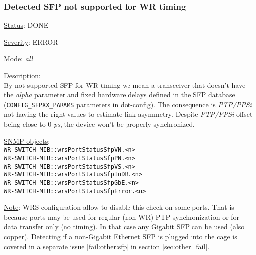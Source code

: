 \subsubsection{\bf Detected SFP not supported for WR timing}
		\label{fail:timing:wrong_sfp}
		\begin{packed_enum}
			\item [] \underline{Status}: DONE
			\item [] \underline{Severity}: ERROR
			\item [] \underline{Mode}: \emph{all}
			\item [] \underline{Description}:\\
				By not supported SFP for WR timing we mean a transceiver that doesn't
				have the \emph{alpha} parameter and fixed hardware delays defined in the
				SFP database (\texttt{CONFIG\_SFPXX\_PARAMS} parameters in dot-config). The consequence is
				\emph{PTP/PPSi} not having the right values to estimate link asymmetry.
				Despite \emph{PTP/PPSi} offset being close to 0 \emph{ps}, the device won't
				be properly synchronized.
			\item [] \underline{SNMP objects}:\\
				\texttt{WR-SWITCH-MIB::wrsPortStatusSfpVN.<n>}\\
				\texttt{WR-SWITCH-MIB::wrsPortStatusSfpPN.<n>}\\
				\texttt{WR-SWITCH-MIB::wrsPortStatusSfpVS.<n>}\\
				\texttt{WR-SWITCH-MIB::wrsPortStatusSfpInDB.<n>}\\
				\texttt{WR-SWITCH-MIB::wrsPortStatusSfpGbE.<n>}\\
				\texttt{WR-SWITCH-MIB::wrsPortStatusSfpError.<n>}
			\item [] \underline{Note}: WRS configuration allow to disable this check on some ports.
				That is because ports may be used for regular (non-WR) PTP
				synchronization or for data transfer only (no timing). In that case any
				Gigabit SFP can be used (also copper). Detecting if a non-Gigabit
				Ethernet SFP is plugged into the cage is covered in a separate issue
				\ref{fail:other:sfp} in section \ref{sec:other_fail}.
		\end{packed_enum}

